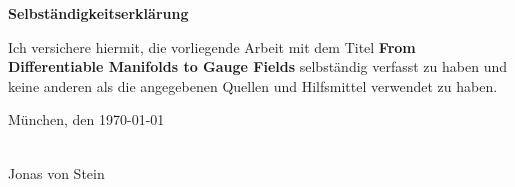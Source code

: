 \documentclass[a4paper,11pt,twoside,openright]{report}
\newcommand{\thesistitleEng}{From Differentiable Manifolds to Gauge Fields}
\newcommand{\authorname}{Jonas von Stein}
\newcommand{\thesisdate}{\today}
\begin{document}

\cleardoublepage
{}



\clearpage{\pagestyle{empty}\cleardoublepage}
\thispagestyle{empty}

\vspace*{1cm}
{\huge \textbf{Selbst{\"a}ndigkeitserkl{\"a}rung}}\\
\vspace*{1cm}

Ich versichere hiermit, die vorliegende Arbeit mit dem Titel \textbf{\thesistitleEng} selbst{\"a}ndig verfasst zu haben und keine anderen als die angegebenen Quellen und Hilfsmittel verwendet zu haben.

M{\"u}nchen, den \thesisdate
\vspace*{1cm}
 
\noindent\makebox[5cm]{\hrulefill}\\
\vspace{0.3cm}
\authorname
\end{document}
